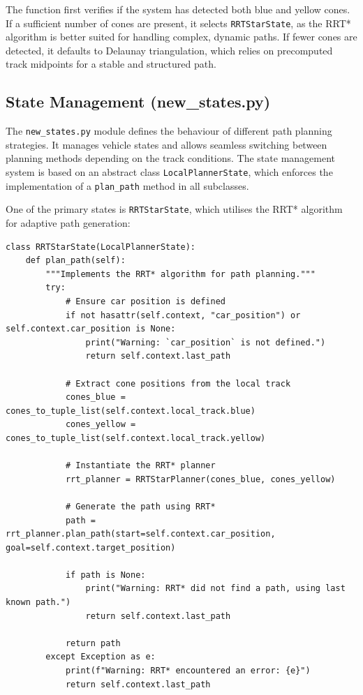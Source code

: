 \documentclass[a4paper,11pt]{report}
\begin{document}
The function first verifies if the system has detected both blue and yellow cones. If a sufficient number of cones are present, it selects \texttt{RRTStarState}, as the RRT* algorithm is better suited for handling complex, dynamic paths. If fewer cones are detected, it defaults to Delaunay triangulation, which relies on precomputed track midpoints for a stable and structured path.

\subsection{State Management (new\_states.py)}
The \texttt{new\_states.py} module defines the behaviour of different path planning strategies. It manages vehicle states and allows seamless switching between planning methods depending on the track conditions. The state management system is based on an abstract class \texttt{LocalPlannerState}, which enforces the implementation of a \texttt{plan\_path} method in all subclasses.

One of the primary states is \texttt{RRTStarState}, which utilises the RRT* algorithm for adaptive path generation:

\begin{verbatim}
class RRTStarState(LocalPlannerState):
    def plan_path(self):
        """Implements the RRT* algorithm for path planning."""
        try:
            # Ensure car position is defined
            if not hasattr(self.context, "car_position") or self.context.car_position is None:
                print("Warning: `car_position` is not defined.")
                return self.context.last_path

            # Extract cone positions from the local track
            cones_blue = cones_to_tuple_list(self.context.local_track.blue)
            cones_yellow = cones_to_tuple_list(self.context.local_track.yellow)
            
            # Instantiate the RRT* planner
            rrt_planner = RRTStarPlanner(cones_blue, cones_yellow)
            
            # Generate the path using RRT*
            path = rrt_planner.plan_path(start=self.context.car_position, goal=self.context.target_position)
            
            if path is None:
                print("Warning: RRT* did not find a path, using last known path.")
                return self.context.last_path

            return path
        except Exception as e:
            print(f"Warning: RRT* encountered an error: {e}")
            return self.context.last_path
\end{verbatim}
\end{document}
